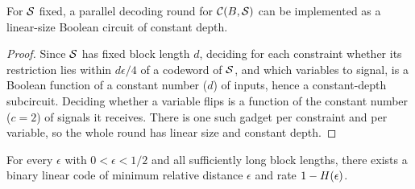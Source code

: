 \begin{proposition}
  \label{prop:round-circuit}
  For $\mathcal{S}$ fixed, a parallel decoding round for $\mathcal{C}(B,\mathcal{S})$ can be
  implemented as a linear-size Boolean circuit of constant depth.
\end{proposition}
\begin{proof}
  Since $\mathcal{S}$ has fixed block length $d$, deciding for each constraint whether
  its restriction lies within $d\epsilon/4$ of a codeword of $\mathcal{S}$, and which
  variables to signal, is a Boolean function of a constant number ($d$) of
  inputs, hence a constant-depth subcircuit. Deciding whether a variable flips
  is a function of the constant number ($c=2$) of signals it receives. There is
  one such gadget per constraint and per variable, so the whole round has linear
  size and constant depth.
\end{proof}

\begin{lemma}
  \label{lem:gilbert-varshamov}
  \notready
  For every $\epsilon$ with $0<\epsilon<1/2$ and all sufficiently long block
  lengths, there exists a binary linear code of minimum relative distance
  $\epsilon$ and rate $1-H(\epsilon)$.
\end{lemma}

